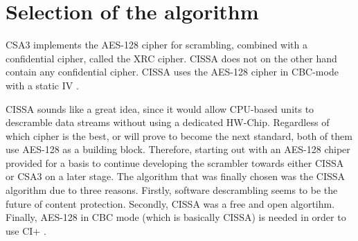\section{Selection of the algorithm}
CSA3 implements the AES-128 cipher for scrambling, combined with a 
confidential cipher, called the XRC cipher. CISSA does not on the 
other hand contain any confidential cipher. CISSA uses the AES-128 
cipher in CBC-mode with a static IV \citep{DVB:2013}.

CISSA sounds like a great idea, since it would allow CPU-based units 
to descramble data streams without using a dedicated HW-Chip. Regardless
of which cipher is the best, or will prove to become the next standard, 
both of them use AES-128 as a building block. Therefore, starting out 
with an AES-128 chiper provided for a basis to continue developing 
the scrambler towards either CISSA or CSA3 on a later stage. The 
algorithm that was finally chosen was the CISSA algorithm due to three
reasons. Firstly, software descrambling seems to be the future of 
content protection. Secondly, CISSA was a free and open algortihm. 
Finally, AES-128 in CBC mode (which is basically CISSA) is needed in 
order to use CI+ \citep[p. 15]{CI+:2011}.


